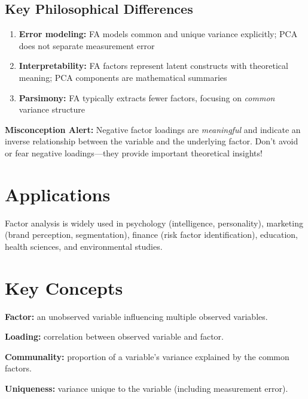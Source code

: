 \documentclass[a4paper]{tufte-book}
\newcommand{\tecbluetext}[1]{\textcolor{tecblue}{\textbf{#1}}}
\begin{document}

\subsection{Key Philosophical Differences}
\begin{enumerate}[leftmargin=*,itemsep=0.8em]
  \item \tecbluetext{Error modeling:} FA models common and unique variance explicitly; PCA does not separate measurement error
  \item \tecbluetext{Interpretability:} FA factors represent latent constructs with theoretical meaning; PCA components are mathematical summaries
  \item \tecbluetext{Parsimony:} FA typically extracts fewer factors, focusing on \textit{common} variance structure
\end{enumerate}

\begin{commonissue}
\textbf{Misconception Alert:} Negative factor loadings are \textit{meaningful} and indicate an inverse relationship between the variable and the underlying factor. Don't avoid or fear negative loadings—they provide important theoretical insights!
\end{commonissue}

\section{Applications}
Factor analysis is widely used in psychology (intelligence, personality), marketing (brand perception, segmentation), finance (risk factor identification), education, health sciences, and environmental studies.

\section{Key Concepts}

\textbf{Factor:} an unobserved variable influencing multiple observed variables.

\textbf{Loading:} correlation between observed variable and factor.

\textbf{Communality:} proportion of a variable's variance explained by the common factors.

\textbf{Uniqueness:} variance unique to the variable (including measurement error).
\end{document}
